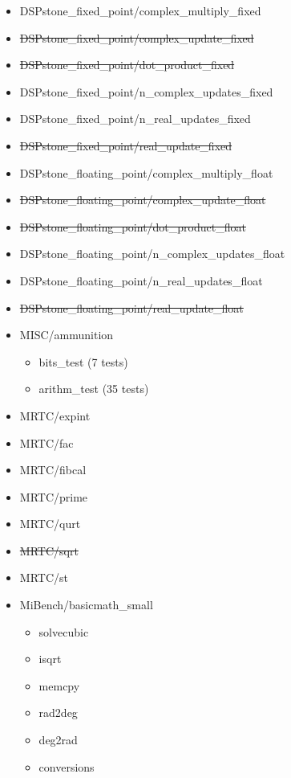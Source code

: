 \documentclass[a4paper]{article}
\begin{document}
\begin{itemize}
	\item  DSPstone\_fixed\_point/complex\_multiply\_fixed
	\item  \st{DSPstone\_fixed\_point/complex\_update\_fixed}
	\item  \st{DSPstone\_fixed\_point/dot\_product\_fixed}
	\item  DSPstone\_fixed\_point/n\_complex\_updates\_fixed
 	\item  DSPstone\_fixed\_point/n\_real\_updates\_fixed
	\item  \st{DSPstone\_fixed\_point/real\_update\_fixed}
	\item  DSPstone\_floating\_point/complex\_multiply\_float
	\item  \st{DSPstone\_floating\_point/complex\_update\_float}
	\item  \st{DSPstone\_floating\_point/dot\_product\_float}
	\item  DSPstone\_floating\_point/n\_complex\_updates\_float
	\item  DSPstone\_floating\_point/n\_real\_updates\_float
	\item  \st{DSPstone\_floating\_point/real\_update\_float}
	\item  MISC/ammunition
    	\begin{itemize}
            \item bits\_test (7 tests)
            \item arithm\_test (35 tests)     
        \end{itemize}
	\item  MRTC/expint
    \item  MRTC/fac
    \item  MRTC/fibcal
    \item  MRTC/prime
    \item  MRTC/qurt
    \item  \st{MRTC/sqrt}
	\item  MRTC/st
	\item  MiBench/basicmath\_small
    	\begin{itemize}
        	\item solvecubic
            \item isqrt
            \item memcpy
            \item rad2deg
            \item deg2rad
            \item conversions
            
        \end{itemize}
    	
\end{itemize}
\end{document}
